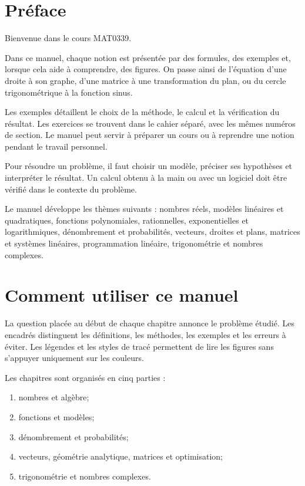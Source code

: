 \chapter*{Préface}
Bienvenue dans le cours MAT0339.

Dans ce manuel, chaque notion est présentée par des formules, des exemples et, lorsque cela aide à comprendre, des figures. On passe ainsi de l'équation d'une droite à son graphe, d'une matrice à une transformation du plan, ou du cercle trigonométrique à la fonction sinus.

Les exemples détaillent le choix de la méthode, le calcul et la vérification du résultat. Les exercices se trouvent dans le cahier séparé, avec les mêmes numéros de section. Le manuel peut servir à préparer un cours ou à reprendre une notion pendant le travail personnel.

Pour résoudre un problème, il faut choisir un modèle, préciser ses hypothèses et interpréter le résultat. Un calcul obtenu à la main ou avec un logiciel doit être vérifié dans le contexte du problème.

\begin{summarybox}
Le manuel développe les thèmes suivants : nombres réels, modèles linéaires et quadratiques, fonctions polynomiales, rationnelles, exponentielles et logarithmiques, dénombrement et probabilités, vecteurs, droites et plans, matrices et systèmes linéaires, programmation linéaire, trigonométrie et nombres complexes.
\end{summarybox}

\chapter*{Comment utiliser ce manuel}
La question placée au début de chaque chapitre annonce le problème étudié. Les encadrés distinguent les définitions, les méthodes, les exemples et les erreurs à éviter. Les légendes et les styles de tracé permettent de lire les figures sans s'appuyer uniquement sur les couleurs.

Les chapitres sont organisés en cinq parties :
\begin{enumerate}
  \item nombres et algèbre;
  \item fonctions et modèles;
  \item dénombrement et probabilités;
  \item vecteurs, géométrie analytique, matrices et optimisation;
  \item trigonométrie et nombres complexes.
\end{enumerate}

